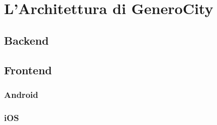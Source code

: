 \chapter{L'Architettura di GeneroCity}
\section{Backend}
\section{Frontend}
\subsection{Android}
\subsection{iOS}
